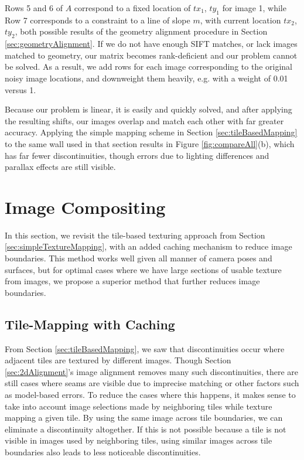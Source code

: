 \documentclass[]{spie}  %
\begin{document}
 Rows 5 and 6 of $A$ correspond to a fixed
location of $tx_1$, $ty_1$ for image 1, while Row 7 corresponds to a
constraint to a line of slope $m$, with current location $tx_2$,
$ty_2$, both possible results of the geometry alignment procedure in
Section \ref{sec:geometryAlignment}. If we do not have enough SIFT
matches, or lack images matched to geometry, our matrix becomes
rank-deficient and our problem cannot be solved. As a result, we add
rows for each image corresponding to the original noisy image
locations, and downweight them heavily, e.g. with a weight of 0.01
versus 1.

Because our problem is linear, it is easily and quickly solved, and
after applying the resulting shifts, our images overlap and match each
other with far greater accuracy. Applying the simple mapping scheme in
Section \ref{sec:tileBasedMapping} to the same wall used in that
section results in Figure \ref{fig:compareAll}(b), which has far fewer
discontinuities, though errors due to lighting differences and
parallax effects are still visible.

\section{Image Compositing}
\label{sec:imageCompositing}
In this section, we revisit the tile-based texturing approach from
Section \ref{sec:simpleTextureMapping}, with an added caching
mechanism to reduce image boundaries. This method works well given all
manner of camera poses and surfaces, but for optimal cases where we
have large sections of usable texture from images, we propose a
superior method that further reduces image boundaries.

\subsection{Tile-Mapping with Caching}
\label{sec:mappingWithCaching}
From Section \ref{sec:tileBasedMapping}, we saw that discontinuities
occur where adjacent tiles are textured by different images. Though
Section \ref{sec:2dAlignment}'s image alignment removes many such
discontinuities, there are still cases where seams are visible due to
imprecise matching or other factors such as model-based errors. To
reduce the cases where this happens, it makes sense to take into
account image selections made by neighboring tiles while texture
mapping a given tile. By using the same image across tile boundaries,
we can eliminate a discontinuity altogether. If this is not possible
because a tile is not visible in images used by neighboring tiles,
using similar images across tile boundaries also leads to less
noticeable discontinuities.
\end{document}
